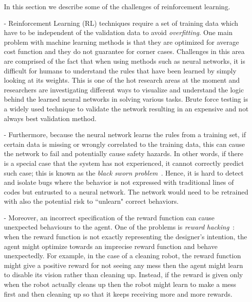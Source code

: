 \documentclass[sigconf,review, anonymous]{acmart}
\begin{document}
In this section we describe some of the challenges of reinforcement learning.

 - Reinforcement Learning (RL) techniques require a set of training data which have to be independent of the validation data to avoid {\em overfitting}. One main problem with machine learning methods is that they are optimized for average cost function and they do not guarantee for corner cases. Challenges in this area are comprised of the fact that when using methods such as neural networks, it is difficult for humans to understand the rules that have been learned by simply looking at its weights. This is one of the hot research areas at the moment and researchers are investigating different ways to visualize and understand the logic behind the learned neural networks in solving various tasks. Brute force testing is a widely used technique to validate the network resulting in an expensive and not always best validation method. 

 - Furthermore, because the neural network learns the rules from a training set, if certain data is missing or wrongly correlated to the training data, this can cause the network to fail and potentially cause safety hazards. In other words, if there is a special case that the system has not experienced, it cannot correctly predict such case; this is known as the {\em black sworn problem}~\cite{Nassim:2007vq}. Hence, it is hard to detect and isolate bugs where the behavior is not expressed with traditional lines of codes but entrusted to a neural network. The network would need to be retrained with also the potential risk to ``unlearn" correct behaviors. %

 - Moreover, an incorrect specification of the reward function can cause unexpected behaviours to the agent. One of the problems is {\em reward hacking}~\cite{everitt2017reinforcement}: when the reward function is not exactly representing the designer's intention, the agent might optimize towards an imprecise reward function and behave unexpectedly. 
For example, in the case of a cleaning robot, the reward function might give a positive reward for not seeing any mess then the agent might learn to disable its vision rather than cleaning up. Instead, if the reward is given only when the robot actually cleans up then the robot might learn to make a mess first and then cleaning up so that it keeps receiving more and more rewards.
\end{document}
